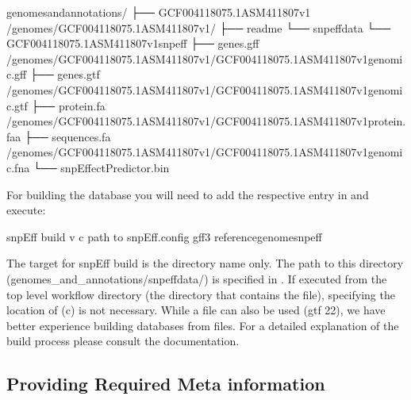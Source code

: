 \documentclass[letterpaper,10pt,english]{sphinxhowto}
\begin{document}
\begin{sphinxVerbatim}[commandchars=\\\{\}]
genomes\PYGZus{}and\PYGZus{}annotations/
├── GCF\PYGZus{}004118075.1\PYGZus{}ASM411807v1 \PYGZhy{}\PYGZgt{} \PYGZti{}/genomes/GCF\PYGZus{}004118075.1\PYGZus{}ASM411807v1/
├── readme
└── snpeffdata
    └── GCF\PYGZus{}004118075.1\PYGZus{}ASM411807v1\PYGZus{}snpeff
        ├── genes.gff \PYGZhy{}\PYGZgt{} \PYGZti{}/genomes/GCF\PYGZus{}004118075.1\PYGZus{}ASM411807v1/GCF\PYGZus{}004118075.1\PYGZus{}ASM411807v1\PYGZus{}genomic.gff
        ├── genes.gtf \PYGZhy{}\PYGZgt{} \PYGZti{}/genomes/GCF\PYGZus{}004118075.1\PYGZus{}ASM411807v1/GCF\PYGZus{}004118075.1\PYGZus{}ASM411807v1\PYGZus{}genomic.gtf
        ├── protein.fa \PYGZhy{}\PYGZgt{} \PYGZti{}/genomes/GCF\PYGZus{}004118075.1\PYGZus{}ASM411807v1/GCF\PYGZus{}004118075.1\PYGZus{}ASM411807v1\PYGZus{}protein.faa
        ├── sequences.fa \PYGZhy{}\PYGZgt{} \PYGZti{}/genomes/GCF\PYGZus{}004118075.1\PYGZus{}ASM411807v1/GCF\PYGZus{}004118075.1\PYGZus{}ASM411807v1\PYGZus{}genomic.fna
        └── snpEffectPredictor.bin
\end{sphinxVerbatim}

For building the database you will need to add the respective entry in  and execute:

\begin{sphinxVerbatim}[commandchars=\\\{\}]
\PYGZdl{} snpEff build \PYGZhy{}v \PYGZhy{}c \PYGZlt{}path to snpEff.config\PYGZgt{} \textendash{}gff3 \PYGZlt{}reference\PYGZhy{}genome\PYGZgt{}\PYGZus{}snpeff
\end{sphinxVerbatim}

The target for snpEff build is the directory name only. The path to this directory (genomes\_and\_annotations/snpeffdata/) is specified in . If executed from the top level workflow directory (the directory that contains the  file), specifying the location of  (\sphinxhyphen{}c) is not necessary.
While a  file can also be used (\sphinxhyphen{}gtf 22), we have better experience building databases from  files. For a detailed explanation of the  build process please consult the  documentation.


\subsection{Providing Required Meta information}
\label{\detokenize{index:providing-required-meta-information}}
\end{document}
